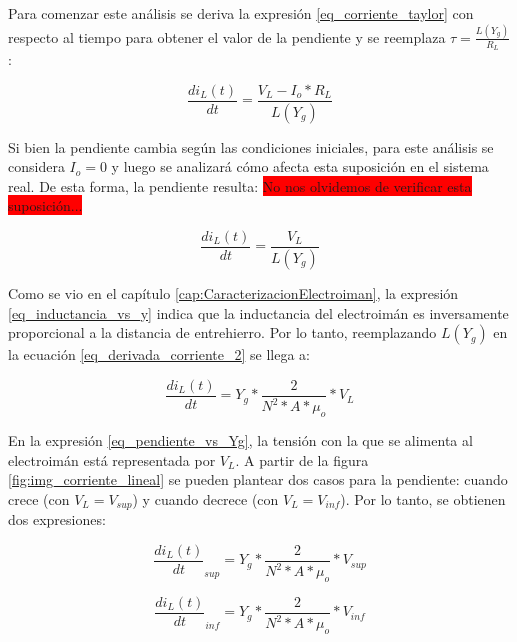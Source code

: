Para comenzar este análisis se deriva la expresión \ref{eq_corriente_taylor} con respecto al tiempo para obtener el valor de la pendiente y se reemplaza $\tau=\frac{L(Y_g)}{R_L}$:


\begin{equation} \label{eq_derivada_corriente}
	\frac{di_L(t)}{dt}=\frac{V_L-I_o*R_L}{L(Y_g)}
\end{equation}

Si bien la pendiente cambia según las condiciones iniciales, para este análisis se considera $I_o=0$ y luego se analizará cómo afecta esta suposición en el sistema real. De esta forma, la pendiente resulta:
\colorbox{red}{No nos olvidemos de verificar esta suposición...}


\begin{equation} \label{eq_derivada_corriente_2}
	\frac{di_L(t)}{dt}= \frac{V_L}{L(Y_g)}
\end{equation}


Como se vio en el capítulo \ref{cap:CaracterizacionElectroiman}, la expresión \ref{eq_inductancia_vs_y} indica que la inductancia del electroimán es inversamente proporcional a la distancia de entrehierro. Por lo tanto, reemplazando $L(Y_g)$ en la ecuación \ref{eq_derivada_corriente_2} se llega a:

\begin{equation}\label{eq_pendiente_vs_Yg}
	\frac{di_L(t)}{dt}= Y_g*\frac{2}{N^2*A*\mu_o}*V_L
\end{equation}

En la expresión \ref{eq_pendiente_vs_Yg}, la tensión con la que se alimenta al electroimán está representada por $V_L$. A partir de la figura \ref{fig:img_corriente_lineal} se pueden plantear dos casos para la pendiente: cuando crece (con $V_L=V_{sup}$) y cuando decrece (con $V_L=V_{inf}$). Por lo tanto, se obtienen dos expresiones:

\begin{equation} 
	\frac{di_L(t)}{dt}_{sup}= Y_g*\frac{2}{N^2*A*\mu_o}*V_{sup}
\end{equation}


\begin{equation}
	\frac{di_L(t)}{dt}_{inf}= Y_g*\frac{2}{N^2*A*\mu_o}*V_{inf}
\end{equation}
%
%

